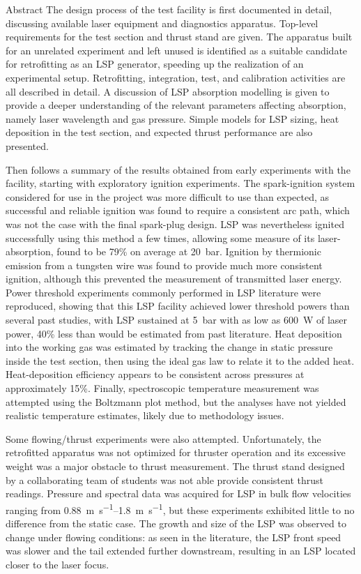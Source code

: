 \begin{plainchp}{Abstract}
    The design process of the test facility is first documented in detail, discussing available laser equipment and diagnostics apparatus. Top-level requirements for the test section and thrust stand are given. The apparatus built for an unrelated experiment and left unused is identified as a suitable candidate for retrofitting as an LSP generator, speeding up the realization of an experimental setup. Retrofitting, integration, test, and calibration activities are all described in detail. A discussion of LSP absorption modelling is given to provide a deeper understanding of the relevant parameters affecting absorption, namely laser wavelength and gas pressure. Simple models for LSP sizing, heat deposition in the test section, and expected thrust performance are also presented.

    Then follows a summary of the results obtained from early experiments with the facility, starting with exploratory ignition experiments. The spark-ignition system considered for use in the project was more difficult to use than expected, as successful and reliable ignition was found to require a consistent arc path, which was not the case with the final spark-plug design. LSP was nevertheless ignited successfully using this method a few times, allowing some measure of its laser-absorption, found to be 79\% on average at \qty{20}{bar}. Ignition by thermionic emission from a tungsten wire was found to provide much more consistent ignition, although this prevented the measurement of transmitted laser energy. Power threshold experiments commonly performed in LSP literature were reproduced, showing that this LSP facility achieved lower threshold powers than several past studies, with LSP sustained at \qty{5}{bar} with as low as \qty{600}{W} of laser power, 40\% less than would be estimated from past literature. Heat deposition into the working gas was estimated by tracking the change in static pressure inside the test section, then using the ideal gas law to relate it to the added heat. Heat-deposition efficiency appears to be consistent across pressures at approximately 15\%. Finally, spectroscopic temperature measurement was attempted using the Boltzmann plot method, but the analyses have not yielded realistic temperature estimates, likely due to methodology issues.

    Some flowing/thrust experiments were also attempted. Unfortunately, the retrofitted apparatus was not optimized for thruster operation and its excessive weight was a major obstacle to thrust measurement. The thrust stand designed by a collaborating team of students was not able provide consistent thrust readings. Pressure and spectral data was acquired for LSP in bulk flow velocities ranging from \qtyrange{0.88}{1.8}{m.s^{-1}}, but these experiments exhibited little to no difference from the static case. The growth and size of the LSP was observed to change under flowing conditions: as seen in the literature, the LSP front speed was slower and the tail extended further downstream, resulting in an LSP located closer to the laser focus.


\end{plainchp}
